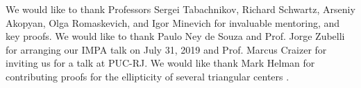 \begin{acknowledgements}
We would like to thank Professors Sergei Tabachnikov, Richard Schwartz, Arseniy Akopyan, Olga Romaskevich, and Igor Minevich for invaluable mentoring, and key proofs. We would like to thank Paulo Ney de Souza and Prof. Jorge Zubelli for arranging our IMPA talk on July 31, 2019 \cite{impa2019} and Prof. Marcus Craizer for inviting us for a talk at PUC-RJ. We would like thank Mark Helman for contributing proofs for the ellipticity of several triangular centers \cite{helman19}.
\end{acknowledgements}